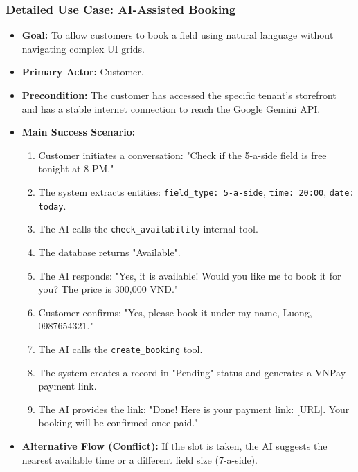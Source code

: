 \subsubsection{Detailed Use Case: AI-Assisted Booking}
\begin{itemize}
    \item \textbf{Goal:} To allow customers to book a field using natural language without navigating complex UI grids.
    \item \textbf{Primary Actor:} Customer.
    \item \textbf{Precondition:} The customer has accessed the specific tenant's storefront and has a stable internet connection to reach the Google Gemini API.
    \item \textbf{Main Success Scenario:}
    \begin{enumerate}
        \item Customer initiates a conversation: "Check if the 5-a-side field is free tonight at 8 PM."
        \item The system extracts entities: \texttt{field\_type: 5-a-side}, \texttt{time: 20:00}, \texttt{date: today}.
        \item The AI calls the \texttt{check\_availability} internal tool.
        \item The database returns "Available".
        \item The AI responds: "Yes, it is available! Would you like me to book it for you? The price is 300,000 VND."
        \item Customer confirms: "Yes, please book it under my name, Luong, 0987654321."
        \item The AI calls the \texttt{create\_booking} tool.
        \item The system creates a record in "Pending" status and generates a VNPay payment link.
        \item The AI provides the link: "Done! Here is your payment link: [URL]. Your booking will be confirmed once paid."
    \end{enumerate}
    \item \textbf{Alternative Flow (Conflict):} If the slot is taken, the AI suggests the nearest available time or a different field size (7-a-side).
\end{itemize}

